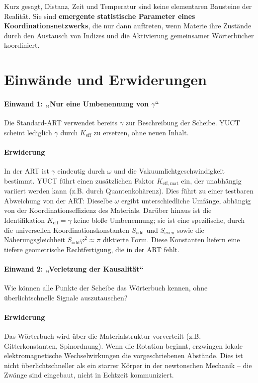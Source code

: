 \documentclass[12pt,a4paper]{article}
\newcommand{\Sodd}{S_{\mathrm{odd}}}
\newcommand{\Seven}{S_{\mathrm{even}}}
\begin{document}
	Kurz gesagt, Distanz, Zeit und Temperatur sind keine elementaren Bausteine der Realität. Sie sind \textbf{emergente statistische Parameter eines Koordinationsnetzwerks}, die nur dann auftreten, wenn Materie ihre Zustände durch den Austausch von Indizes und die Aktivierung gemeinsamer Wörterbücher koordiniert.
	
	\section{Einwände und Erwiderungen}
	\label{sec:objections}
	
	\paragraph{Einwand 1: „Nur eine Umbenennung von \(\gamma\)“}
	Die Standard-ART verwendet bereits \(\gamma\) zur Beschreibung der Scheibe. YUCT scheint lediglich \(\gamma\) durch \(K_{\mathrm{eff}}\) zu ersetzen, ohne neuen Inhalt.
	
	\paragraph{Erwiderung}
	In der ART ist \(\gamma\) eindeutig durch \(\omega\) und die Vakuumlichtgeschwindigkeit bestimmt. YUCT führt einen zusätzlichen Faktor \(K_{\mathrm{eff,mat}}\) ein, der unabhängig variiert werden kann (z.B. durch Quantenkohärenz). Dies führt zu einer testbaren Abweichung von der ART: Dieselbe \(\omega\) ergibt unterschiedliche Umfänge, abhängig von der Koordinationseffizienz des Materials. Darüber hinaus ist die Identifikation \(K_{\mathrm{eff}} = \gamma\) keine bloße Umbenennung; sie ist eine spezifische, durch die universellen Koordinationskonstanten \(\Sodd\) und \(\Seven\) sowie die Näherungsgleichheit \(\Sodd \varphi^2 \approx \pi\) diktierte Form. Diese Konstanten liefern eine tiefere geometrische Rechtfertigung, die in der ART fehlt.
	
	\paragraph{Einwand 2: „Verletzung der Kausalität“}
	Wie können alle Punkte der Scheibe das Wörterbuch kennen, ohne überlichtschnelle Signale auszutauschen?
	
	\paragraph{Erwiderung}
	Das Wörterbuch wird über die Materialstruktur vorverteilt (z.B. Gitterkonstanten, Spinordnung). Wenn die Rotation beginnt, erzwingen lokale elektromagnetische Wechselwirkungen die vorgeschriebenen Abstände. Dies ist nicht überlichtschneller als ein starrer Körper in der newtonschen Mechanik – die Zwänge sind eingebaut, nicht in Echtzeit kommuniziert.
	
\end{document}
